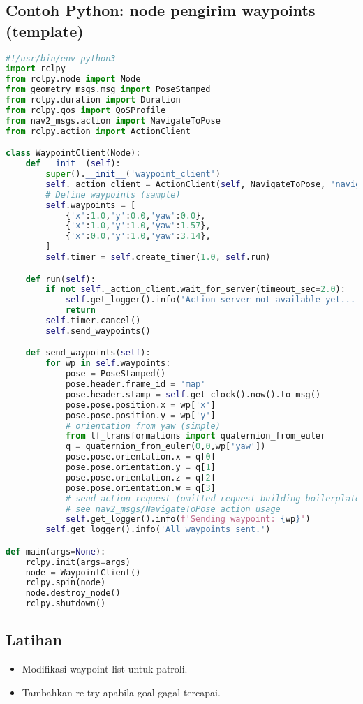 \documentclass[12pt,a4paper]{article}
\begin{document}
\subsection*{Contoh Python: node pengirim waypoints (template)}
\begin{lstlisting}[language=python]
#!/usr/bin/env python3
import rclpy
from rclpy.node import Node
from geometry_msgs.msg import PoseStamped
from rclpy.duration import Duration
from rclpy.qos import QoSProfile
from nav2_msgs.action import NavigateToPose
from rclpy.action import ActionClient

class WaypointClient(Node):
    def __init__(self):
        super().__init__('waypoint_client')
        self._action_client = ActionClient(self, NavigateToPose, 'navigate_to_pose')
        # Define waypoints (sample)
        self.waypoints = [
            {'x':1.0,'y':0.0,'yaw':0.0},
            {'x':1.0,'y':1.0,'yaw':1.57},
            {'x':0.0,'y':1.0,'yaw':3.14},
        ]
        self.timer = self.create_timer(1.0, self.run)

    def run(self):
        if not self._action_client.wait_for_server(timeout_sec=2.0):
            self.get_logger().info('Action server not available yet...')
            return
        self.timer.cancel()
        self.send_waypoints()

    def send_waypoints(self):
        for wp in self.waypoints:
            pose = PoseStamped()
            pose.header.frame_id = 'map'
            pose.header.stamp = self.get_clock().now().to_msg()
            pose.pose.position.x = wp['x']
            pose.pose.position.y = wp['y']
            # orientation from yaw (simple)
            from tf_transformations import quaternion_from_euler
            q = quaternion_from_euler(0,0,wp['yaw'])
            pose.pose.orientation.x = q[0]
            pose.pose.orientation.y = q[1]
            pose.pose.orientation.z = q[2]
            pose.pose.orientation.w = q[3]
            # send action request (omitted request building boilerplate for brevity)
            # see nav2_msgs/NavigateToPose action usage
            self.get_logger().info(f'Sending waypoint: {wp}')
        self.get_logger().info('All waypoints sent.')

def main(args=None):
    rclpy.init(args=args)
    node = WaypointClient()
    rclpy.spin(node)
    node.destroy_node()
    rclpy.shutdown()
\end{lstlisting}

\subsection*{Latihan}
\begin{itemize}
    \item Modifikasi waypoint list untuk patroli.
    \item Tambahkan re-try apabila goal gagal tercapai.
\end{itemize}
\end{document}
